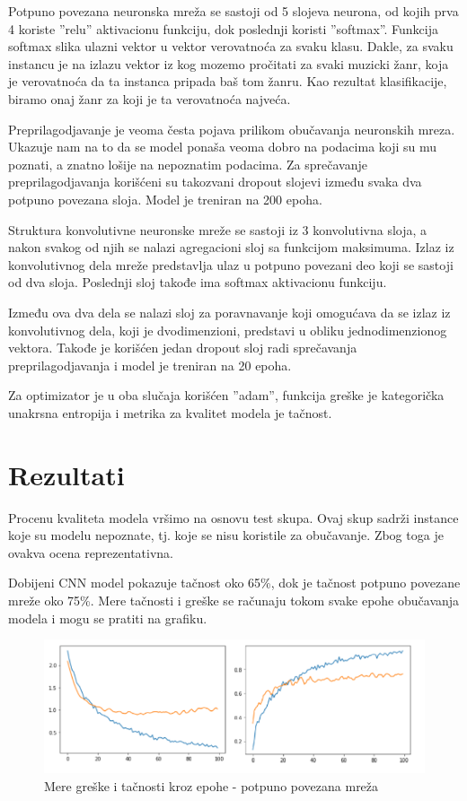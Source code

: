 \documentclass{article}
\begin{document}
Potpuno povezana neuronska mreža se sastoji od 5 slojeva neurona, od kojih prva 4 koriste ''relu'' aktivacionu funkciju, dok poslednji koristi ''softmax''. Funkcija softmax slika ulazni vektor u vektor verovatnoća za svaku klasu. Dakle, za svaku instancu je na izlazu vektor iz kog mozemo pročitati za svaki muzicki žanr, koja je verovatnoća da ta instanca pripada baš tom žanru. Kao rezultat klasifikacije, biramo onaj žanr za koji je ta verovatnoća najveća.

Preprilagodjavanje je veoma česta pojava prilikom obučavanja neuronskih mreza. Ukazuje nam na to da se model ponaša veoma dobro na podacima koji su mu poznati, a znatno lošije na nepoznatim podacima. Za sprečavanje preprilagodjavanja korišćeni su takozvani dropout slojevi između svaka dva potpuno povezana sloja. Model je treniran na 200 epoha.

Struktura konvolutivne neuronske mreže se sastoji iz 3 konvolutivna sloja, a nakon svakog od njih se nalazi agregacioni sloj sa funkcijom maksimuma. Izlaz iz konvolutivnog dela mreže predstavlja ulaz u potpuno povezani deo koji se sastoji od dva sloja. Poslednji sloj takođe ima softmax aktivacionu funkciju.

Između ova dva dela se nalazi sloj za poravnavanje koji omogućava da se izlaz iz konvolutivnog dela, koji je dvodimenzioni, predstavi u obliku jednodimenzionog vektora. Takođe je korišćen jedan dropout sloj radi sprečavanja preprilagodjavanja i model je treniran na 20 epoha.

Za optimizator je u oba slučaja korišćen ''adam'', funkcija greške je kategorička unakrsna entropija i metrika za kvalitet modela je tačnost. 

\newpage

\section{Rezultati}

Procenu kvaliteta modela vršimo na osnovu test skupa. Ovaj skup sadrži instance koje su modelu nepoznate, tj. koje se nisu koristile za obučavanje. Zbog toga je ovakva ocena reprezentativna.

Dobijeni CNN model pokazuje tačnost oko 65\%, dok je tačnost potpuno povezane mreže oko 75\%. Mere tačnosti i greške se računaju tokom svake epohe obučavanja modela i mogu se pratiti na grafiku.

\begin{figure}[h]
\centering
\includegraphics[scale=0.7]{history}
\caption{Mere greške i tačnosti kroz epohe - potpuno povezana mreža}
\end{figure}
\end{document}
